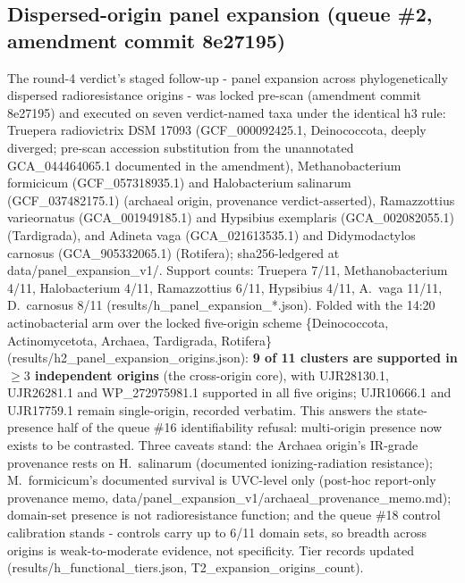 \documentclass[12pt,a4paper]{article}
\begin{document}
\subsection{Dispersed-origin panel expansion (queue \#2, amendment commit 8e27195)}
The round-4 verdict's staged follow-up - panel expansion across phylogenetically dispersed radioresistance origins - was locked pre-scan (amendment commit 8e27195) and executed on seven verdict-named taxa under the identical h3 rule: Truepera radiovictrix DSM 17093 (GCF\_000092425.1, Deinococcota, deeply diverged; pre-scan accession substitution from the unannotated GCA\_044464065.1 documented in the amendment), Methanobacterium formicicum (GCF\_057318935.1) and Halobacterium salinarum (GCF\_037482175.1) (archaeal origin, provenance verdict-asserted), Ramazzottius varieornatus (GCA\_001949185.1) and Hypsibius exemplaris (GCA\_002082055.1) (Tardigrada), and Adineta vaga (GCA\_021613535.1) and Didymodactylos carnosus (GCA\_905332065.1) (Rotifera); sha256-ledgered at data/panel\_expansion\_v1/. Support counts: Truepera 7/11, Methanobacterium 4/11, Halobacterium 4/11, Ramazzottius 6/11, Hypsibius 4/11, A.\ vaga 11/11, D.\ carnosus 8/11 (results/h\_panel\_expansion\_*.json). Folded with the 14:20 actinobacterial arm over the locked five-origin scheme \{Deinococcota, Actinomycetota, Archaea, Tardigrada, Rotifera\} (results/h2\_panel\_expansion\_origins.json): \textbf{9 of 11 clusters are supported in $\geq 3$ independent origins} (the cross-origin core), with UJR28130.1, UJR26281.1 and WP\_272975981.1 supported in all five origins; UJR10666.1 and UJR17759.1 remain single-origin, recorded verbatim. This answers the state-presence half of the queue \#16 identifiability refusal: multi-origin presence now exists to be contrasted. Three caveats stand: the Archaea origin's IR-grade provenance rests on H.\ salinarum (documented ionizing-radiation resistance); M.\ formicicum's documented survival is UVC-level only (post-hoc report-only provenance memo, data/panel\_expansion\_v1/archaeal\_provenance\_memo.md); domain-set presence is not radioresistance function; and the queue \#18 control calibration stands - controls carry up to 6/11 domain sets, so breadth across origins is weak-to-moderate evidence, not specificity. Tier records updated (results/h\_functional\_tiers.json, T2\_expansion\_origins\_count).
\end{document}
